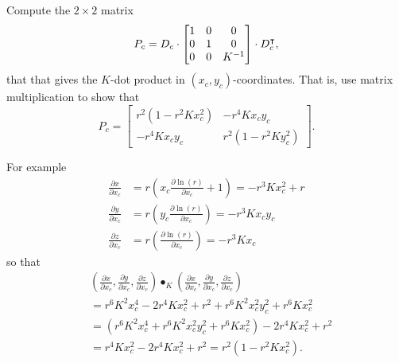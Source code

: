 \documentclass{ximera}
\begin{document}
\begin{problem}
\label{32}Compute the $2\times2$ matrix%
\[
P_{c}=D_{c}\cdot\begin{bmatrix}
1 & 0 & 0\\
0 & 1 & 0\\
0 & 0 & K^{-1}%
\end{bmatrix} \cdot D_{c}^\transpose,
\]
that that gives the $K$-dot product in $\left(  x_{c},y_{c}\right)
$-coordinates. That is, use matrix multiplication to show that%
\[
P_{c}=
\begin{bmatrix}
r^{2}\left(  1-r^{2}Kx_{c}^{2}\right)  & -r^{4}Kx_{c}y_{c}\\
-r^{4}Kx_{c}y_{c} & r^{2}\left(  1-r^{2}Ky_{c}^{2}\right)
\end{bmatrix} .
\]


\begin{hint}For example%
\begin{align*}
\frac{\partial x}{\partial x_{c}}  &  =r\left(  x_{c}\frac{\partial \ln\left(
r\right)  }{\partial x_{c}}+1\right)  =-r^{3}Kx_{c}^{2}+r\\
\frac{\partial y}{\partial x_{c}}  &  =r\left(  y_{c}\frac{\partial \ln\left(
r\right)  }{\partial x_{c}}\right)  =-r^{3}Kx_{c}y_{c}\\
\frac{\partial z}{\partial x_{c}}  &  =r\left(  \frac{\partial \ln\left(
r\right)  }{\partial x_{c}}\right)  =-r^{3}Kx_{c}%
\end{align*}
so that%
\begin{align*}
&  \left(  \frac{\partial x}{\partial x_{c}},\frac{\partial y}{\partial x_{c}%
},\frac{\partial z}{\partial x_{c}}\right)  \bullet_{K}\left(  \frac{\partial
x}{\partial x_{c}},\frac{\partial y}{\partial x_{c}},\frac{\partial
z}{\partial x_{c}}\right) \\
&  =r^{6}K^{2}x_{c}^{4}-2r^{4}Kx_{c}^{2}+r^{2}+r^{6}K^{2}x_{c}^{2}y_{c}%
^{2}+r^{6}Kx_{c}^{2}\\
&  =\left(  r^{6}K^{2}x_{c}^{4}+r^{6}K^{2}x_{c}^{2}y_{c}^{2}+r^{6}Kx_{c}%
^{2}\right)  -2r^{4}Kx_{c}^{2}+r^{2}\\
&  =r^{4}Kx_{c}^{2}-2r^{4}Kx_{c}^{2}+r^{2}=r^{2}\left(  1-r^{2}Kx_{c}%
^{2}\right)  .
\end{align*}
\end{hint}
\end{problem}
\end{document}
